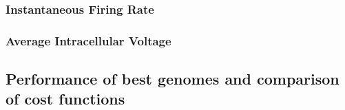 \subsubsection{Instantaneous Firing Rate}
\subsubsection{Average Intracellular Voltage}



\subsection{Performance of best genomes and comparison of cost functions }




